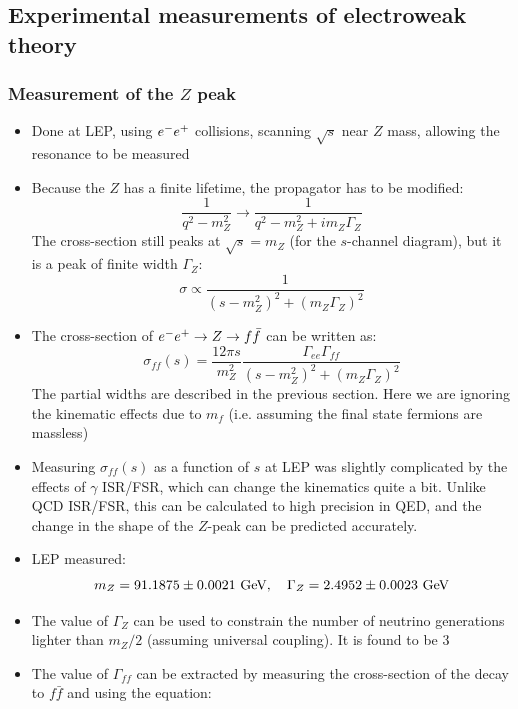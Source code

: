 \subsection{Experimental measurements of electroweak theory}
\subsubsection{Measurement of the $Z$ peak}
\begin{itemize}
  \item Done at LEP, using $e^{-} e^{+}$ collisions, scanning $\sqrt s$ near $Z$ mass, allowing the resonance to be measured
  \item Because the $Z$ has a finite lifetime, the propagator has to be modified:
  \begin{equation}
    \frac{1}{q^2-m_Z^2} \rightarrow \frac{1}{q^2-m_Z^2 + im_Z\Gamma_Z}
  \end{equation}
  The cross-section still peaks at $\sqrt s = m_Z$ (for the $s$-channel diagram), but it is a peak of finite width $\Gamma_Z$:
  \begin{equation}
    \sigma \propto \frac{1}{(s-m_Z^2)^2 + (m_Z\Gamma_Z)^2}
  \end{equation}
  \item The cross-section of $e^{-}e^{+}\rightarrow Z \rightarrow f\bar f$ can be written as:
  \begin{equation}
    \sigma_{ff}(s) = \frac{12\pi s}{m_Z^2} \frac{\Gamma_{ee}\Gamma_{ff}}{(s-m_Z^2)^2 + (m_Z\Gamma_Z)^2}
  \end{equation}
  The partial widths are described in the previous section. Here we are ignoring the kinematic effects due to $m_f$ (i.e. assuming the final state fermions are massless)
  \item Measuring $\sigma_{ff}(s)$ as a function of $s$ at LEP was slightly complicated by the effects of $\gamma$ ISR/FSR, which can change the kinematics quite a bit. Unlike QCD ISR/FSR, this can be calculated to high precision in QED, and the change in the shape of the $Z$-peak can be predicted accurately.
  \item LEP measured:
  \begin{equation}
    m_Z = 91.1875 \pm 0.0021~\text{GeV}, \quad \Gamma_Z = 2.4952 \pm 0.0023 ~\text{GeV}
  \end{equation}
  \item The value of $\Gamma_Z$ can be used to constrain the number of neutrino generations lighter than $m_Z/2$ (assuming universal coupling). It is found to be $3$
  \item The value of $\Gamma_{ff}$ can be extracted by measuring the cross-section of the decay to $f\bar f$ and using the equation:

\end{itemize}
